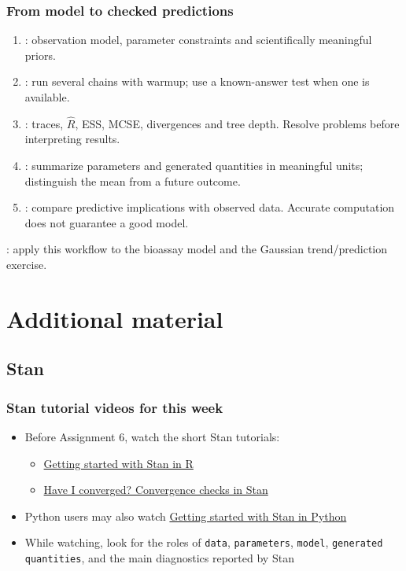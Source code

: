 \documentclass[10pt]{beamer}
\begin{document}
\begin{frame}
\frametitle{From model to checked predictions}

\begin{enumerate}
\item {}: observation model, parameter constraints and
  scientifically meaningful priors.
\item {}: run several chains with warmup; use a known-answer
  test when one is available.
\item {}: traces, $\widehat R$, ESS, MCSE,
  divergences and tree depth. Resolve problems before interpreting results.
\item {}: summarize parameters and generated
  quantities in meaningful units; distinguish the mean from a future outcome.
\item {}: compare predictive implications with
  observed data. Accurate computation does not guarantee a good model.
\end{enumerate}

\vfill
{}: apply this workflow to the bioassay model and
the Gaussian trend/prediction exercise.
\end{frame}

\section{Additional material}
\frame{\sectionpage}
\subsection{Stan}

\begin{frame}

\frametitle{Stan tutorial videos for this week}

  \begin{itemize}
  \item Before Assignment 6, watch the short Stan tutorials:
    \begin{itemize}
    \item \href{https://www.youtube.com/watch?v=4t6niM6sksI}{Getting started with Stan in R}
    \item \href{https://www.youtube.com/watch?v=0FdMZwIbJ_4}{Have I converged? Convergence checks in Stan}
    \end{itemize}
  \item Python users may also watch
    \href{https://www.youtube.com/watch?v=YtR18hdAWmU}{Getting started with Stan in Python}
  \item While watching, look for the roles of \texttt{data},
    \texttt{parameters}, \texttt{model}, \texttt{generated quantities},
    and the main diagnostics reported by Stan
  \end{itemize}

\end{frame}
\end{document}
